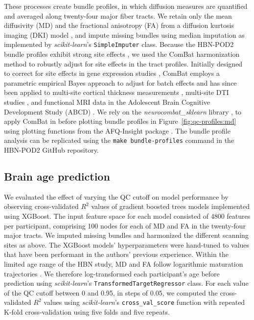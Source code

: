 \documentclass[9pt,lineno]{elife}
\begin{document}
These processes create bundle profiles, in which diffusion measures are
quantified and averaged along twenty-four major fiber tracts. We retain only the
mean diffusivity (MD) and the fractional anisotropy (FA) from a diffusion
kurtosis imaging (DKI) model \citep{jensen2005-ta}, and impute missing bundles
using median imputation as implemented by \emph{scikit-learn}'s
\texttt{SimpleImputer} class. 
Because the HBN-POD2 bundle
profiles exhibit strong site effects \citep{richie-halford2021multidimensional},
we used the ComBat harmonization method to robustly adjust for site effects in
the tract profiles. Initially designed to correct for site effects in gene
expression studies \citep{Johnson2007-kl}, ComBat employs a parametric empirical
Bayes approach to adjust for batch effects and has since been applied to
multi-site cortical thickness measurements \citep{fortin2018-hk}, multi-site DTI
studies \citep{fortin2017-be}, and functional MRI data in the Adolescent Brain
Cognitive Development Study (ABCD) \citep{nielson2018detecting}. We rely on the
\emph{neurocombat\_sklearn} library \citep{neurocombat-sklearn}, to apply ComBat in
before plotting bundle profiles in Figure~\ref{fig:qc-profiles:md} using
plotting functions from the AFQ-Insight package
\citep{richie-halford2019insight}. The bundle profile analysis can be replicated
using the \texttt{make bundle-profiles} command in the HBN-POD2 GitHub
repository.

\subsection{Brain age prediction}

We evaluated the effect of varying the QC cutoff on model performance by
observing cross-validated $R^2$ values of gradient boosted trees models
implemented using XGBoost. The input feature space for each model consisted of
\num{4800} features per participant, comprising 100 nodes for each of MD and FA in
the twenty-four major tracts. We imputed missing bundles and harmonized the
different scanning sites as above. The XGBoost models' hyperparameters were
hand-tuned to values that have been performant in the authors' previous
experience. Within the limited age range of the HBN study, MD and FA follow logarithmic maturation trajectories \cite{yeatman2014lifespan}. We therefore log-transformed each participant's age before prediction using
\emph{scikit-learn}'s \texttt{TransformedTargetRegressor} class. For each value
of the QC cutoff between 0 and 0.95, in steps of 0.05, we computed the
cross-validated $R^2$ values using \emph{scikit-learn}'s
\texttt{cross\_val\_score} function with repeated K-fold cross-validation using
five folds and five repeats.
\end{document}

